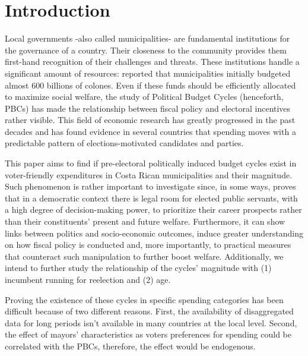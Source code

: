 \newpage
\setcounter{page}{1}

\section{Introduction}

Local governments -also called municipalities- are fundamental institutions for the governance of a country. Their closeness to the community provides them first-hand recognition of their challenges and threats. These institutions handle a significant amount of resources: \textcite{cgr2020} reported that municipalities initially budgeted almost 600 billions of colones. Even if these funds should be efficiently allocated to maximize social welfare, the study of Political Budget Cycles (henceforth, PBCs) has made the relationship between fiscal policy and electoral incentives rather visible. This field of economic research has greatly progressed in the past decades and has found evidence in several countries that spending moves with a predictable pattern of elections-motivated candidates and parties. \parencite{chortareas2016,drazen2010}

This paper aims to find if pre-electoral politically induced budget cycles exist in voter-friendly expenditures in Costa Rican municipalities and their magnitude. Such phenomenon is rather important to investigate since, in some ways, proves that in a democratic context there is legal room for elected public servants, with a high degree of decision-making power, to prioritize their career prospects rather than their constituents' present and future welfare. Furthermore, it can show links between politics and socio-economic outcomes, induce greater understanding on how fiscal policy is conducted and, more importantly, to practical measures that counteract such manipulation to further boost welfare. Additionally, we intend to further study the relationship of the cycles’ magnitude with (1) incumbent running for reelection and (2) age. \parencite{alesina2018,chortareas2016}

Proving the existence of these cycles in specific spending categories has been difficult because of two different reasons.  First, the availability of disaggregated data for long periods isn’t available in many countries at the local level. Second, the effect of mayors’ characteristics as voters preferences for spending could be correlated with the PBCs, therefore, the effect would be endogenous. 

